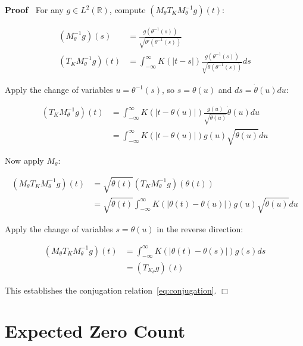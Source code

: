 \documentclass{article}
\newenvironment{proof}{\noindent\textbf{Proof\ }}{\hspace*{\fill}$\Box$\medskip}
\begin{document}
\begin{proof}
  For any $g \in L^2 (\mathbb{R})$, compute $(M_{\theta} T_K M_{\theta}^{- 1}
  g) (t)$:
  
  \begin{align}
    (M_{\theta}^{- 1} g) (s) & = \frac{g (\theta^{- 1} (s))}{\sqrt{\theta'
    (\theta^{- 1} (s))}} \\
    (T_K M_{\theta}^{- 1} g) (t) & = \int_{- \infty}^{\infty} K (|t - s|)
    \frac{g (\theta^{- 1} (s))}{\sqrt{\dot{\theta} (\theta^{- 1} (s))}} ds 
  \end{align}
  
  Apply the change of variables $u = \theta^{- 1} (s)$, so $s = \theta (u)$
  and $ds = \dot{\theta} (u) du$:
  
  \begin{align}
    (T_K M_{\theta}^{- 1} g) (t) & = \int_{- \infty}^{\infty} K (|t - \theta
    (u) |) \frac{g (u)}{\sqrt{\dot{\theta} (u)}}  \dot{\theta} (u) du \\
    & = \int_{- \infty}^{\infty} K (|t - \theta (u) |) g (u)
    \sqrt{\dot{\theta} (u)} du 
  \end{align}
  
  Now apply $M_{\theta}$:
  
  \begin{align}
    (M_{\theta} T_K M_{\theta}^{- 1} g) (t) & = \sqrt{\dot{\theta} (t)}  (T_K
    M_{\theta}^{- 1} g) (\theta (t)) \\
    & = \sqrt{\dot{\theta} (t)}  \int_{- \infty}^{\infty} K (| \theta (t) -
    \theta (u) |) g (u) \sqrt{\dot{\theta} (u)} du 
  \end{align}
  
  Apply the change of variables $s = \theta (u)$ in the reverse direction:
  
  \begin{align}
    (M_{\theta} T_K M_{\theta}^{- 1} g) (t) & = \int_{- \infty}^{\infty} K (|
    \theta (t) - \theta (s) |) g (s) ds \\
    & = (T_{K_{\theta}} g) (t) 
  \end{align}
  
  This establishes the conjugation relation~\eqref{eq:conjugation}.
\end{proof}

\section{Expected Zero Count}\label{sec:zero_count}
\end{document}
